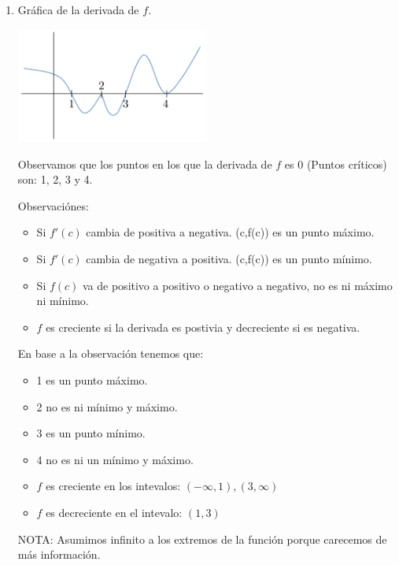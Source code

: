 \documentclass[12pt]{article}
\begin{document}
\begin{enumerate}[\hspace{9px} a)]
    \item Gr\'afica de la derivada de $f$.\medskip
    
        \includegraphics[width=0.5\textwidth]{ejer-a}\medskip

        Observamos que los puntos en los que la derivada de $f$ es 0 (Puntos cr\'iticos) son: 1, 2, 3 y 4.

        Observaci\'ones: 
        \begin{itemize}
            \item Si $f'(c)$ cambia de positiva a negativa. (c,f(c)) es un punto m\'aximo.
            \item Si $f'(c)$ cambia de negativa a positiva. (c,f(c)) es un punto m\'inimo.
            \item Si $f(c)$ va de positivo a positivo o negativo a negativo, no es ni m\'aximo ni m\'inimo.
            \item $f$ es creciente si la derivada es postivia y decreciente si es negativa.
        \end{itemize}\medskip

        En base a la observaci\'on tenemos que:
        \begin{itemize}
            \item 1 es un punto m\'aximo.
            \item 2 no es ni m\'inimo y m\'aximo.
            \item 3 es un punto m\'inimo.
            \item 4 no es ni un m\'inimo y m\'aximo.\bigskip
            \item $f$ es creciente en los intevalos: \((-\infty,1),(3,\infty)\)
            \item $f$ es decreciente en el intevalo: \((1,3)\)
        \end{itemize}\medskip

        NOTA: Asumimos infinito a los extremos de la funci\'on porque carecemos de m\'as informaci\'on.\medskip 


\end{enumerate}
\end{document}
